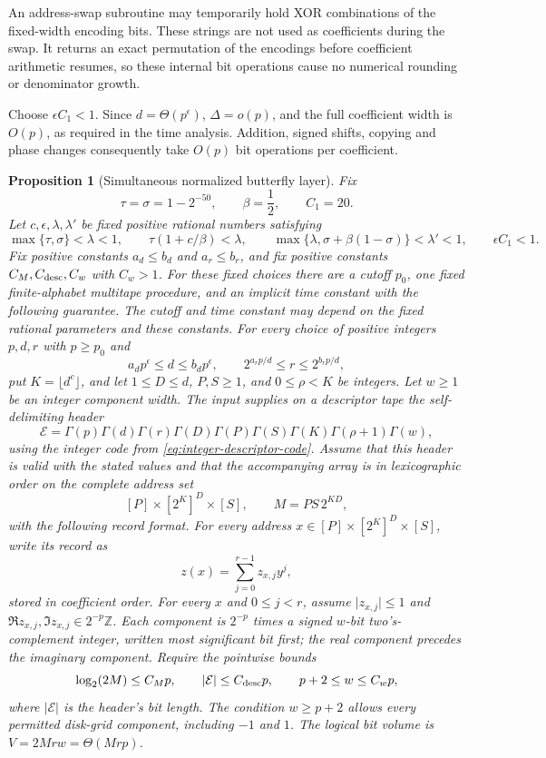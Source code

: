 \documentclass[11pt]{article}
\newtheorem{proposition}[theorem]{Proposition}
\theoremstyle{definition}
\begin{document}
An address-swap subroutine may temporarily hold XOR combinations of
the fixed-width encoding bits.  These strings are not used as
coefficients during the swap.  It returns an exact permutation of
the encodings before coefficient arithmetic resumes, so these
internal bit operations cause no numerical rounding or denominator
growth.

Choose \(\epsilon C_1<1\).  Since \(d=\Theta(p^\epsilon)\),
\(\Delta=o(p)\), and the full coefficient width is \(O(p)\), as
required in the time analysis.  Addition, signed shifts, copying and
phase changes consequently take \(O(p)\) bit operations per
coefficient.

\begin{proposition}[Simultaneous normalized butterfly layer]
\label{prop:simultaneous-layer}
Fix
\[
 \tau=\sigma=1-2^{-50},\qquad \beta=\frac12,\qquad C_1=20.
\]
Let $c,\epsilon,\lambda,\lambda'$ be fixed positive rational numbers
satisfying
\[
 \max\{\tau,\sigma\}<\lambda<1,\qquad
 \tau(1+c/\beta)<\lambda,\qquad
 \max\{\lambda,\sigma+\beta(1-\sigma)\}<\lambda'<1,
 \qquad \epsilon C_1<1.
\]
Fix positive constants $a_d\le b_d$ and $a_r\le b_r$, and fix
positive constants $C_M,C_{\rm desc},C_w$ with $C_w>1$.
For these fixed choices
there are a cutoff $p_0$, one fixed finite-alphabet multitape procedure,
and an implicit time constant with the following guarantee. The cutoff
and time constant may depend on the fixed rational parameters
and these constants. For every choice of positive integers $p,d,r$
with $p\ge p_0$ and
\[
 a_dp^\epsilon\le d\le b_dp^\epsilon,\qquad
 2^{a_rp/d}\le r\le 2^{b_rp/d},
\]
put $K=\lfloor d^c\rfloor$, and let $1\le D\le d$, $P,S\ge1$, and
$0\le\rho<K$ be integers. Let $w\ge1$ be an integer component width.
The input supplies on a descriptor tape
the self-delimiting header
\[
 \mathcal E=
 \Gamma(p)\Gamma(d)\Gamma(r)\Gamma(D)\Gamma(P)\Gamma(S)
 \Gamma(K)\Gamma(\rho+1)\Gamma(w),
\]
using the integer code from
\eqref{eq:integer-descriptor-code}. Assume that this header
is valid with the stated values and that the accompanying array is
in lexicographic order on the complete address set
\[
 [P]\times[2^K]^D\times[S],
 \qquad M=PS\,2^{KD},
\]
with the following record format. For every address
$x\in[P]\times[2^K]^D\times[S]$, write its record as
\[
 z(x)=\sum_{j=0}^{r-1}z_{x,j}y^j,
\]
stored in coefficient order. For every $x$ and $0\le j<r$, assume
$\lvert z_{x,j}\rvert\le1$ and
$\Re z_{x,j},\Im z_{x,j}\in2^{-p}\mathbb Z$.
Each component is $2^{-p}$ times a signed $w$-bit two's-complement
integer, written most significant bit first; the real component
precedes the imaginary component. Require the pointwise bounds
\[
 \log_2(2M)\le C_Mp,\qquad
 |\mathcal E|\le C_{\rm desc}p,\qquad
 p+2\le w\le C_wp,
\]
where $|\mathcal E|$ is the header's bit length. The condition
$w\ge p+2$ allows every permitted disk-grid component, including
$-1$ and $1$. The logical bit volume is $V=2Mrw=\Theta(Mrp)$.


\end{proposition}
\end{document}

